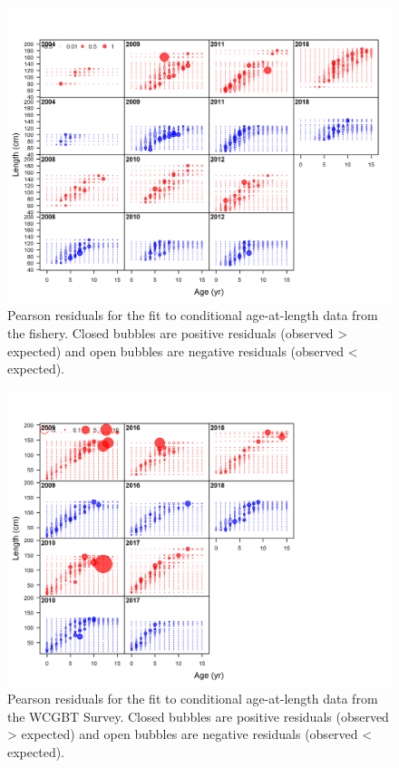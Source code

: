 \documentclass[12pt,]{article}
\begin{document}
\begin{figure}
\centering
\includegraphics{r4ss/plots_mod1/comp_condAALfit_residsflt1mkt2.png}
\caption{Pearson residuals for the fit to conditional age-at-length data
from the fishery. Closed bubbles are positive residuals (observed
\textgreater{} expected) and open bubbles are negative residuals
(observed \textless{} expected). \label{fig:age_fit_fishery}}
\end{figure}

\begin{figure}
\centering
\includegraphics{r4ss/plots_mod1/comp_condAALfit_residsflt5mkt0.png}
\caption{Pearson residuals for the fit to conditional age-at-length data
from the WCGBT Survey. Closed bubbles are positive residuals (observed
\textgreater{} expected) and open bubbles are negative residuals
(observed \textless{} expected). \label{fig:age_fit_WCGBTS}}
\end{figure}
\end{document}
